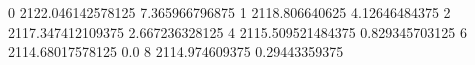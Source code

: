 0 2122.046142578125 7.365966796875
1 2118.806640625 4.12646484375
2 2117.347412109375 2.667236328125
4 2115.509521484375 0.829345703125
6 2114.68017578125 0.0
8 2114.974609375 0.29443359375
